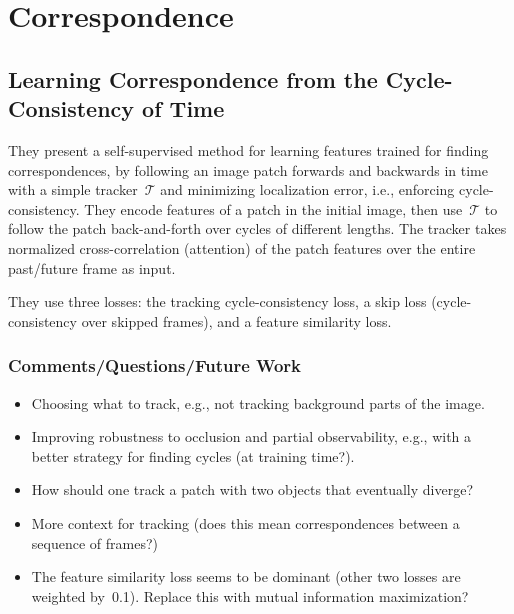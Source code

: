 \documentclass[a4paper, 12pt]{article}
\begin{document}
\section{Correspondence}

\subsection{Learning Correspondence from the Cycle-Consistency of
            Time~\cite{wang2019learning}}

They present a self-supervised method for learning features trained for finding
correspondences, by following an image patch forwards and backwards in time
with a simple tracker~$\mathcal{T}$ and minimizing localization error, i.e.,
enforcing cycle-consistency.
They encode features of a patch in the initial image, then use~$\mathcal{T}$ to
follow the patch back-and-forth over cycles of different lengths.
The tracker takes normalized cross-correlation (attention) of the patch
features over the entire past/future frame as input.

They use three losses: the tracking cycle-consistency loss, a skip loss
(cycle-consistency over skipped frames), and a feature similarity loss.


\subsubsection{Comments/Questions/Future Work}

\begin{itemize}
        \item Choosing what to track, e.g., not tracking background parts of
                the image.

        \item Improving robustness to occlusion and partial observability,
                e.g., with a better strategy for finding cycles (at training
                time?).

        \item How should one track a patch with two objects that eventually
                diverge?

        \item More context for tracking (does this mean correspondences between
                a sequence of frames?)

        \item The feature similarity loss seems to be dominant (other two
                losses are weighted by~\num{0.1}).
                Replace this with mutual information maximization?
\end{itemize}
\end{document}
